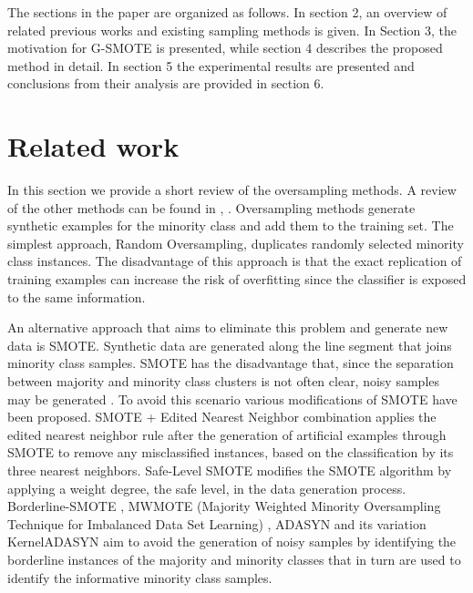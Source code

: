 \documentclass[parskip=full]{scrartcl}
\begin{document}
The sections in the paper are organized as follows. In section 2, an overview of related previous works and existing sampling methods is given. In Section 3, the motivation for G-SMOTE is presented, while section 4 describes the proposed method in detail. In section 5 the experimental results are presented and conclusions from their analysis are provided in section 6.

\section{Related work}
In this section we provide a short review of the oversampling methods. A review of the other methods can be found in \cite{Galar2012}, \cite{Chawla2005}. Oversampling methods generate synthetic examples for the minority class and add them to the training set. The simplest approach, Random Oversampling, duplicates randomly selected minority class instances. The disadvantage of this approach is that the exact replication of training examples can increase the risk of overfitting since the classifier is exposed to the same information. 

An alternative approach that aims to eliminate this problem and generate new data is SMOTE. Synthetic data are generated along the line segment that joins minority class samples. SMOTE has the disadvantage that, since the separation between majority and minority class clusters is not often clear, noisy samples may be generated \cite{He2009}. To avoid this scenario various modifications of SMOTE have been proposed. SMOTE + Edited Nearest Neighbor \cite{Batista2004} combination applies the edited nearest neighbor rule \cite{Wilson1972} after the generation of artificial examples through SMOTE to remove any misclassified instances, based on the classification by its three nearest neighbors. Safe-Level SMOTE \cite{Bunkhumpornpat2009} modifies the SMOTE algorithm by applying a weight degree, the safe level, in the data generation process. Borderline-SMOTE \cite{Han2005}, MWMOTE (Majority Weighted Minority Oversampling Technique for Imbalanced Data Set Learning) \cite{Barua2014}, ADASYN and its variation KernelADASYN \cite{Tang2015} aim to avoid the generation of noisy samples by identifying the borderline instances of the majority and minority classes that in turn are used to identify the informative minority class samples. 
\end{document}
